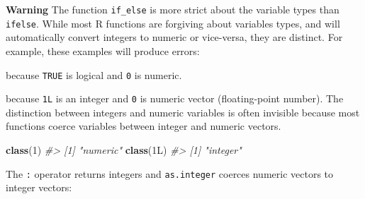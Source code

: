 \documentclass[]{book}
\newenvironment{Shaded}{\begin{snugshade}}{\end{snugshade}}
\newcommand{\KeywordTok}[1]{\textcolor[rgb]{0.13,0.29,0.53}{\textbf{#1}}}
\newcommand{\DataTypeTok}[1]{\textcolor[rgb]{0.13,0.29,0.53}{#1}}
\newcommand{\DecValTok}[1]{\textcolor[rgb]{0.00,0.00,0.81}{#1}}
\newcommand{\StringTok}[1]{\textcolor[rgb]{0.31,0.60,0.02}{#1}}
\newcommand{\CommentTok}[1]{\textcolor[rgb]{0.56,0.35,0.01}{\textit{#1}}}
\newcommand{\OtherTok}[1]{\textcolor[rgb]{0.56,0.35,0.01}{#1}}
\newcommand{\OperatorTok}[1]{\textcolor[rgb]{0.81,0.36,0.00}{\textbf{#1}}}
\newcommand{\NormalTok}[1]{#1}
\theoremstyle{definition}
\theoremstyle{definition}
\theoremstyle{definition}
\theoremstyle{remark}
\begin{document}
\textbf{Warning} The function \texttt{if\_else} is more strict about the
variable types than \texttt{ifelse}. While most R functions are
forgiving about variables types, and will automatically convert integers
to numeric or vice-versa, they are distinct. For example, these examples
will produce errors:

\begin{Shaded}
\end{Shaded}

because \texttt{TRUE} is logical and \texttt{0} is numeric.

\begin{Shaded}
\end{Shaded}

because \texttt{1L} is an integer and \texttt{0} is numeric vector
(floating-point number). The distinction between integers and numeric
variables is often invisible because most functions coerce variables
between integer and numeric vectors.

\begin{Shaded}
\begin{Highlighting}[]
\KeywordTok{class}\NormalTok{(}\DecValTok{1}\NormalTok{)}
\CommentTok{#> [1] "numeric"}
\KeywordTok{class}\NormalTok{(1L)}
\CommentTok{#> [1] "integer"}
\end{Highlighting}
\end{Shaded}

The \texttt{:} operator returns integers and \texttt{as.integer} coerces
numeric vectors to integer vectors:
\end{document}
